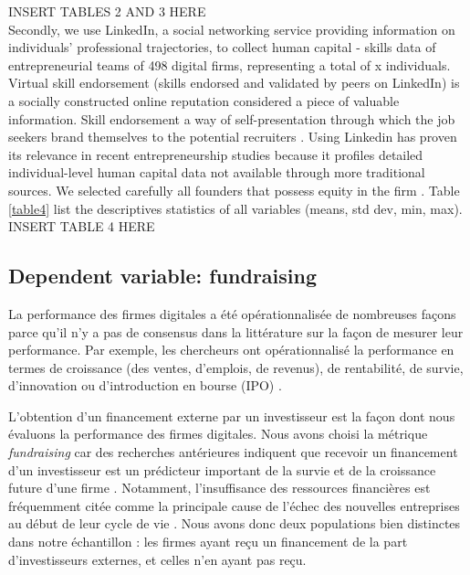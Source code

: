 \documentclass[12pt]{article}
\begin{document}
INSERT TABLES 2 AND 3 HERE \\

Secondly, we use LinkedIn, a social networking service providing information on individuals' professional trajectories, to collect human capital - skills data of entrepreneurial teams of 498 digital firms, representing a total of x individuals. Virtual skill endorsement (skills endorsed and validated by peers on LinkedIn) is a socially constructed online reputation considered a piece of valuable information. Skill endorsement a way of self-presentation through which the job seekers brand themselves to the potential recruiters \citep{rapanta2017linkedin}. Using Linkedin has proven its relevance in recent entrepreneurship studies because it profiles detailed individual-level human capital data not available through more traditional sources. We selected carefully all founders that possess equity in the firm \citep{knight2020start, xie2020does}. Table \ref{table4} list the descriptives statistics of all variables (means, std dev, min, max). \\

INSERT TABLE 4 HERE

\subsection{Dependent variable: fundraising}

La performance des firmes digitales a été opérationnalisée de nombreuses façons parce qu'il n'y a pas de consensus dans la littérature sur la façon de mesurer leur performance. Par exemple, les chercheurs ont opérationnalisé la performance en termes de croissance (des ventes, d'emplois, de revenus), de rentabilité, de survie, d'innovation ou d'introduction en bourse (IPO) \citep{delmar2003arriving}.

L'obtention d'un financement externe par un investisseur est la façon dont nous évaluons la performance des firmes digitales. Nous avons choisi la métrique \textit{fundraising} car des recherches antérieures indiquent que recevoir un financement d'un investisseur est un prédicteur important de la survie et de la croissance future d'une firme \citep{beckman2007early}. Notamment, l'insuffisance des ressources financières est fréquemment citée comme la principale cause de l'échec des nouvelles entreprises au début de leur cycle de vie \citep{franke2008venture, eddleston2016you}. Nous avons donc deux populations bien distinctes dans notre échantillon : les firmes ayant reçu un financement de la part d'investisseurs externes, et celles n'en ayant pas reçu.
\end{document}
